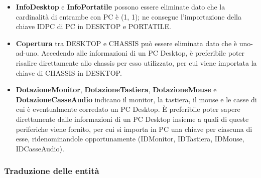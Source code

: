 \documentclass[a4paper,12pt]{report}
\begin{document}
\begin{itemize}
	\item \textbf{InfoDesktop} e \textbf{InfoPortatile} possono essere eliminate dato che la cardinalità di entrambe con PC è (1, 1); ne consegue l'importazione della chiave IDPC di PC in DESKTOP e PORTATILE.
	\item \textbf{Copertura} tra DESKTOP e CHASSIS può essere eliminata dato che è uno-ad-uno. Accedendo alle informazioni di un PC Desktop, è preferibile poter risalire direttamente allo chassis per esso utilizzato, per cui viene importata la chiave di CHASSIS in DESKTOP.
	\item \textbf{DotazioneMonitor}, \textbf{DotazioneTastiera}, \textbf{DotazioneMouse} e \textbf{DotazioneCasseAudio} indicano il monitor, la tastiera, il mouse e le casse di cui è eventualmente corredato un PC Desktop. È preferibile poter sapere direttamente dalle informazioni di un PC Desktop insieme a quali di queste periferiche viene fornito, per cui si importa in PC una chiave per ciascuna di esse, ridenominandole opportunamente (IDMonitor, IDTastiera, IDMouse, IDCasseAudio).
\end{itemize}

\subsubsection*{Traduzione delle entità}
\end{document}
